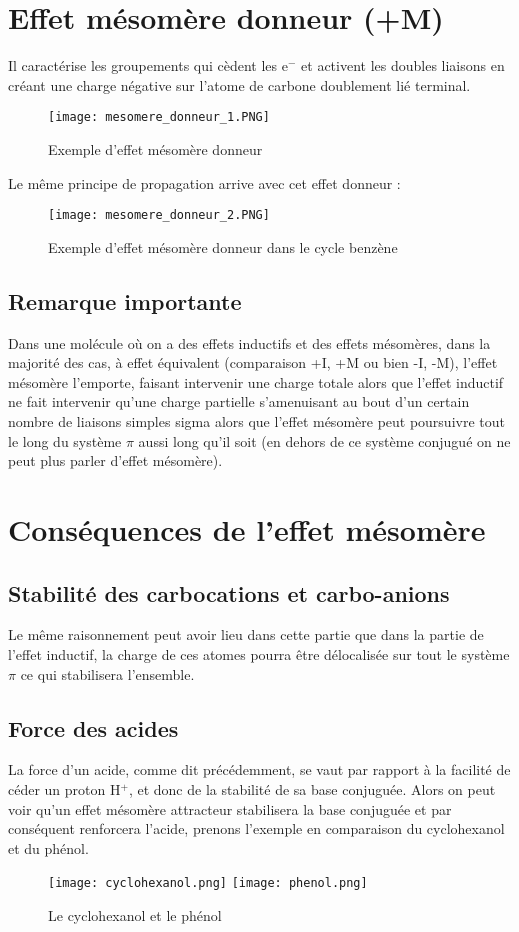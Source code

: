 \documentclass[a4paper, oneside]{book}
\begin{document}
\section{Effet mésomère donneur (+M)}
Il caractérise les groupements qui cèdent les e$^-$ et activent les doubles liaisons en créant une charge négative sur l'atome de carbone doublement lié terminal.
\begin{figure}[!h]
    \centering
    \texttt{[image: mesomere\_donneur\_1.PNG]}
    \caption{Exemple d'effet mésomère donneur}
    \label{fig:my_label}
\end{figure}
\newpage
Le même principe de propagation arrive avec cet effet donneur :
\begin{figure}[!h]
    \centering
    \texttt{[image: mesomere\_donneur\_2.PNG]}
    \caption{Exemple d'effet mésomère donneur dans le cycle benzène}
    \label{fig:my_label}
\end{figure}
\subsection*{Remarque importante}
Dans une molécule où on a des effets inductifs et des effets mésomères, dans la majorité des cas, à effet équivalent (comparaison +I, +M ou bien -I, -M), l'effet mésomère l'emporte, faisant intervenir une charge totale alors que l'effet inductif ne fait intervenir qu'une charge partielle s'amenuisant au bout d'un certain nombre de liaisons simples sigma alors que l'effet mésomère peut poursuivre tout le long du système $\pi$ aussi long qu'il soit (en dehors de ce système conjugué on ne peut plus parler d'effet mésomère).
\section{Conséquences de l'effet mésomère}
\subsection{Stabilité des carbocations et carbo-anions}
Le même raisonnement peut avoir lieu dans cette partie que dans la partie de l'effet inductif, la charge de ces atomes pourra être délocalisée sur tout le système $\pi$  ce qui stabilisera l'ensemble.
\subsection{Force des acides}
La force d'un acide, comme dit précédemment, se vaut par rapport à la facilité de céder un proton H$^+$, et donc de la stabilité de sa base conjuguée. Alors on peut voir qu'un effet mésomère attracteur stabilisera la base conjuguée et par conséquent renforcera l'acide, prenons l'exemple en comparaison du cyclohexanol et du phénol.
\begin{figure}[!h]
    \centering
    \texttt{[image: cyclohexanol.png]}
    \hspace{5cm}
    \texttt{[image: phenol.png]}
    \caption{Le cyclohexanol et le phénol}
    \label{fig:my_label}
\end{figure}
\end{document}
